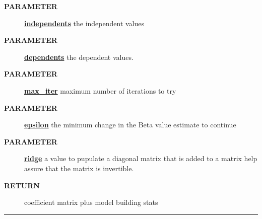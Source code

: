\par
\begin{description}
\item [\colorbox{tagtype}{\color{white} \textbf{\textsf{PARAMETER}}}] \textbf{\underline{independents}} the independent values
\item [\colorbox{tagtype}{\color{white} \textbf{\textsf{PARAMETER}}}] \textbf{\underline{dependents}} the dependent values.
\item [\colorbox{tagtype}{\color{white} \textbf{\textsf{PARAMETER}}}] \textbf{\underline{max\_iter}} maximum number of iterations to try
\item [\colorbox{tagtype}{\color{white} \textbf{\textsf{PARAMETER}}}] \textbf{\underline{epsilon}} the minimum change in the Beta value estimate to continue
\item [\colorbox{tagtype}{\color{white} \textbf{\textsf{PARAMETER}}}] \textbf{\underline{ridge}} a value to pupulate a diagonal matrix that is added to a matrix help assure that the matrix is invertible.
\item [\colorbox{tagtype}{\color{white} \textbf{\textsf{RETURN}}}] \textbf{\underline{}} coefficient matrix plus model building stats
\end{description}

\rule{\linewidth}{0.5pt}
